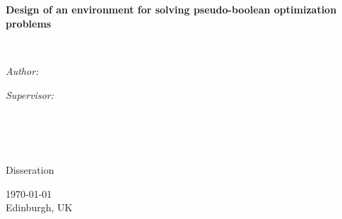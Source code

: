 \documentclass[
11pt, %
oneside, %
english, %
singlespacing, %
headsepline, %
]{MastersDoctoralThesis} %
\author{Marc \textsc{Benedí}} %
\newcommand{\projectTitle}{Design of an environment for solving pseudo-boolean optimization problems}
\newcommand{\courseName}{Disseration}
\newcommand{\city}{Edinburgh, UK}
\begin{document}
\frontmatter %

\pagestyle{plain} %


\begin{titlepage}
\begin{center}

\vspace*{.06\textheight}
{\scshape\LARGE \univname\par}\vspace{1.5cm} %
\textsc{\Large \ttitle}\\[0.5cm] %

\HRule \\[0.4cm] %
{\huge \bfseries \projectTitle\par}\vspace{0.4cm} %
\HRule \\[1.5cm] %
 
\begin{minipage}[t]{0.4\textwidth}
\begin{flushleft} \large
\emph{Author:}\\
\href{http://marcb.pro}{\authorname} %
\end{flushleft}
\end{minipage}
\begin{minipage}[t]{0.4\textwidth}
\begin{flushright} \large
\emph{Supervisor:} \\
\href{https://www.cs.upc.edu/~jordicf/}{\supname} %
\end{flushright}
\end{minipage}\\[3cm]
 
\vfill

\large \textit{ }\\[0.3cm] %
\textit{ }\\[0.4cm]
\courseName\\[2cm]
\vfill

{\large \today \\ \city}\\[4cm] %
 
\vfill
\end{center}
\end{titlepage}
\end{document}
